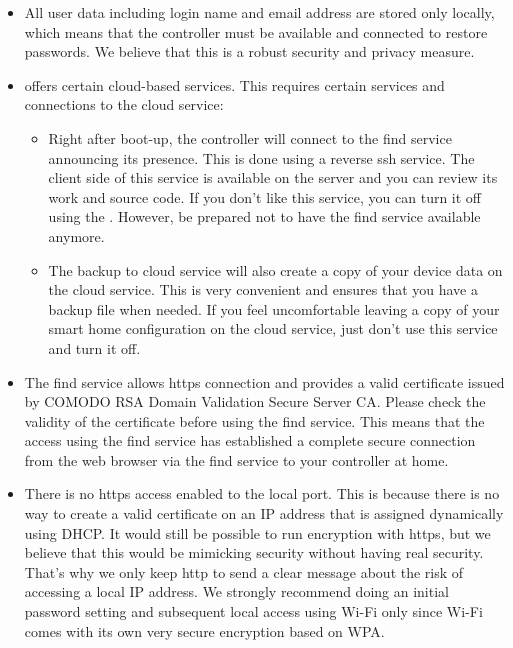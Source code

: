 \begin{itemize}
\item All user data including login name and email address are stored only locally, which 
means that the controller must be available and connected to restore passwords. We 
believe that this is a robust security and privacy measure.

\item \zway offers certain cloud-based services. This requires certain services and 
connections to the \zway cloud service:

\begin{itemize}
\item Right after boot-up, the \zway controller will connect to the find service 
announcing its presence. This is done using a reverse ssh service. The client side of this 
service is available on the \zway server and you can review its work and source code. 
If you don’t like this service, you can turn it off using the \zwshui. 
However, be prepared not to have the find service available anymore.

\item The backup to cloud service will also create a copy of your device data on the 
cloud service. This is very convenient and ensures that you have a backup file when 
needed. If you feel uncomfortable leaving a copy of your smart home configuration 
on the \zway cloud service, just don’t use this service and turn it off.

\end{itemize}

\item The find service allows https connection and provides a valid certificate issued by 
COMODO RSA Domain Validation Secure Server CA. Please check the validity of the 
certificate before using the find service. This means that the access using the find 
service has established a complete secure connection from the web browser via the 
find service to your controller at home.

\item There is no https access enabled to the local port. This is because there is no way 
to create a valid certificate on an IP address that is assigned dynamically using DHCP. 
It would still be possible to run encryption with https, but we believe that this would 
be mimicking security without having real security. That’s why we only keep http to 
send a clear message about the risk of accessing a local IP address. We strongly 
recommend doing an initial password setting and subsequent local access using Wi-Fi 
only since Wi-Fi comes with its own very secure encryption based on WPA.

\end{itemize}


